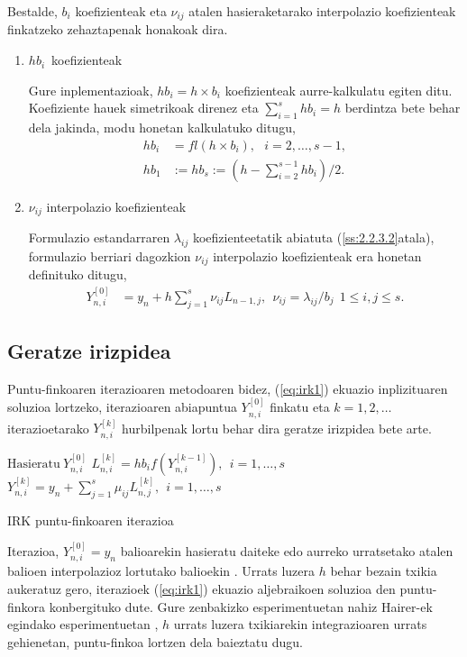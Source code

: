 Bestalde, $b_i$ koefizienteak eta $\nu_{ij}$ atalen hasieraketarako interpolazio koefizienteak finkatzeko zehaztapenak honakoak dira.
\begin{enumerate}
\item $hb_{i}$~koefizienteak

Gure inplementazioak, $hb_i=h \times b_i$ koefizienteak aurre-kalkulatu egiten ditu. Koefiziente hauek simetrikoak direnez eta  $\sum\limits_{i=1}^{s} hb_i=h$ berdintza bete behar dela jakinda, modu honetan kalkulatuko ditugu,
\begin{align*}
hb_i & = fl(h \times b_i), \ \ \ i=2,\dots,s-1, \\
hb_1 & :=hb_s:= \left(h - \sum\limits_{i=2}^{s-1} hb_i \right)/2.
\end{align*}

\item $\nu_{ij}$ interpolazio koefizienteak

Formulazio estandarraren $\lambda_{ij}$ koefizienteetatik abiatuta (\ref{ss:2.2.3.2}atala), formulazio berriari dagozkion $\nu_{ij}$ interpolazio  koefizienteak era honetan definituko ditugu,
\begin{align}
\label{eq: interpLi}
Y_{n,i}^{[0]} &= y_n+ h \sum\limits_{j=1}^{s} \nu_{ij} L_{n-1,j}, \ \ \nu_{ij}=\lambda_{ij}/b_j \ \ 1\leqslant i,j \leqslant s.
\end{align} 

\end{enumerate}

\subsection{Geratze irizpidea}


Puntu-finkoaren iterazioaren metodoaren bidez, (\ref{eq:irk1}) ekuazio inplizituaren soluzioa lortzeko, iterazioaren abiapuntua $Y_{n,i}^{[0]}$  finkatu  eta $k=1,2,\dots$ iterazioetarako $Y_{n,i}^{[k]}$ hurbilpenak lortu behar dira geratze irizpidea bete arte.


\begin{algorithm}[H]
  $\text{Hasieratu} \ Y_{n,i}^{[0]}$\;
  {
  \BlankLine
   $L_{n,i}^{[k]}=hb_if(Y_{n,i}^{[k-1]}), \ \  i=1,\dots,s $\;
   $Y_{n,i}^{[k]}=y_n+\sum\limits_{j=1}^{s} \mu_{ij} L_{n,j}^{[k]} , \ \  i=1,\dots,s $\; 
   }
 \caption{IRK puntu-finkoaren iterazioa}
 \label{alg:pf}
\end{algorithm}
 
Iterazioa,  $Y_{n,i}^{[0]}=y_n$ balioarekin hasieratu daiteke edo aurreko urratsetako atalen balioen interpolazioz lortutako balioekin \cite{Hairer2006}.  Urrats luzera $h$ behar bezain txikia aukeratuz gero, iterazioek (\ref{eq:irk1}) ekuazio aljebraikoen  soluzioa den puntu-finkora konbergituko dute. Gure zenbakizko esperimentuetan nahiz Hairer-ek egindako esperimentuetan \cite{Hairer2008}, $h$ urrats luzera txikiarekin integrazioaren urrats gehienetan, puntu-finkoa lortzen dela baieztatu dugu.    
 
